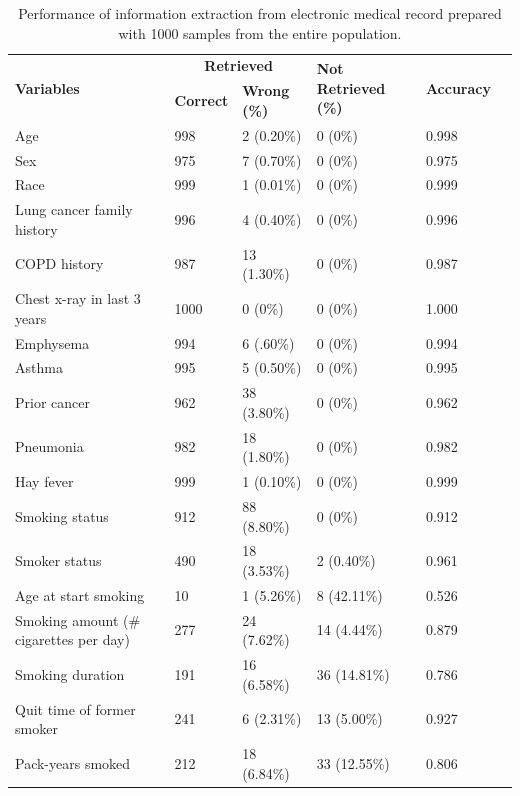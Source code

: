 \documentclass{amia}
\begin{document}
\begin{table}[h]
\centering
\caption{Performance of information extraction from electronic medical record prepared with 1000 samples from the entire population.}
\label{tab:result1}
  \begin{tabular}{|l|l|l|l|l|l|}
  \hline
    \multirow{2}{*}{\textbf{Variables}}  & \multicolumn{2}{c|}{\textbf{Retrieved}}  & \multirow{2}{*}{\textbf{Not Retrieved (\%)}} & \multirow{2}{*}{\textbf{Accuracy}} \\ \cline{2-3}
    
 & \textbf{Correct} & \textbf{Wrong (\%)}  &  &  \\ \hline    
    
 Age & 998 & 2 (0.20\%) & 0 (0\%) & 0.998\\ \hline
 Sex & 975 & 7 (0.70\%) & 0 (0\%) & 0.975\\ \hline 
 Race & 999 & 1 (0.01\%) & 0 (0\%) & 0.999\\ \hline
 Lung cancer family history & 996 & 4 (0.40\%) & 0 (0\%) &  0.996\\ \hline
 COPD history & 987 & 13 (1.30\%) & 0 (0\%) & 0.987\\ \hline
 Chest x-ray in last 3 years & 1000 & 0 (0\%) & 0 (0\%)  & 1.000\\ \hline
 Emphysema & 994 & 6 (.60\%) & 0 (0\%) &  0.994\\ \hline
 Asthma & 995 & 5 (0.50\%) & 0 (0\%) &  0.995\\ \hline
 Prior cancer & 962 & 38 (3.80\%) & 0 (0\%) &  0.962\\ \hline
 Pneumonia & 982 & 18 (1.80\%) & 0 (0\%) & 0.982\\ \hline
 Hay fever & 999 & 1 (0.10\%) & 0 (0\%) &  0.999\\ \hline
 Smoking status & 912 & 88 (8.80\%) & 0 (0\%)  & 0.912\\ \hline
 Smoker status & 490 & 18 (3.53\%) & 2 (0.40\%) &  0.961\\ \hline
 Age at start smoking & 10 & 1 (5.26\%) & 8 (42.11\%) & 0.526\\ \hline
 Smoking amount (\# cigarettes per day) & 277 & 24 (7.62\%) & 14 (4.44\%) & 0.879\\ \hline
 Smoking duration & 191 & 16 (6.58\%) & 36 (14.81\%) & 0.786\\ \hline
 Quit time of former smoker & 241 & 6 (2.31\%) & 13 (5.00\%) & 0.927\\ \hline
 Pack-years smoked & 212 & 18 (6.84\%) & 33 (12.55\%) & 0.806\\ \hline 
 
  \end{tabular}
\end{table}
\end{document}
